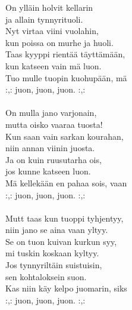 
            On ylläin holvit kellarin  \\
            ja allain tynnyrituoli.  \\
            Nyt virtaa viini vuolahin,  \\
            kun poissa on murhe ja huoli.  \\
            Taas kyyppi rientää täyttämään,  \\
            kun katseen vain mä luon.  \\
            Tuo mulle tuopin kuohupään, mä  \\
            :,: juon, juon, juon. :,: \\
\hspace{10mm} \\
            On mulla jano varjonain,  \\
            mutta oisko vaaraa tuosta!  \\
            Kun saan vain sarkan kourahan,  \\
            niin annan viinin juosta.  \\
            Ja on kuin ruusutarha ois,  \\
            jos kunne katseen luon.  \\
            Mä kellekään en pahaa sois, vaan  \\
            :,: juon, juon, juon. :,: \\
\hspace{10mm} \\
            Mutt taas kun tuoppi tyhjentyy, \\
            niin jano se aina vaan yltyy. \\
            Se on tuon kuivan kurkun syy, \\
            mi tuskin koskaan kyltyy. \\
            Jos tynnyriltäin suistuisin, \\
            sen kohtaloksein suon. \\
            Kas niin käy kelpo juomarin, siks \\
            :,: juon, juon, juon. :,: \\

